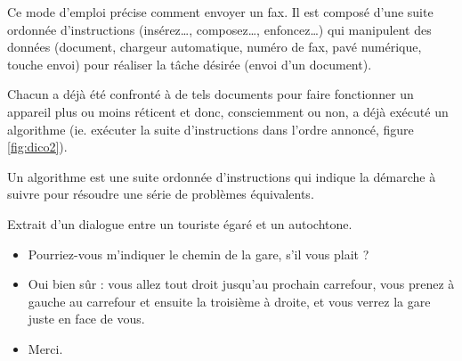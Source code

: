 Ce mode d'emploi précise comment envoyer un fax. Il est composé d'une suite 
ordonnée d'instructions (insérez\ldots, composez\ldots, enfoncez\ldots) qui
manipulent des données (document, chargeur automatique, numéro de fax, pavé numérique,
touche {\sc envoi}) pour réaliser la tâche désirée (envoi d'un document).

Chacun a déjà été confronté à de tels documents pour faire fonctionner un 
appareil plus ou moins réticent et donc, consciemment ou non, 
a déjà exécuté un algorithme (ie. exécuter la suite d'instructions dans l'ordre 
annoncé, figure \ref{fig:dico2}).
\begin{defin}[algorithme]
Un algorithme est une suite ordonnée d'instructions qui indique la démarche 
à suivre pour résoudre une série de problèmes équivalents.
\end{defin}

\begin{ex}\label{ex:cheminGare}
Extrait d'un dialogue entre un touriste égaré et un autochtone.
\begin{itemize}
\item Pourriez-vous m'indiquer le chemin de la gare, s'il vous plait ?
\item Oui bien sûr : vous allez tout droit jusqu'au prochain carrefour,
	vous prenez à gauche au carrefour et ensuite la troisième à droite,
	et vous verrez la gare juste en face de vous.
\item Merci.
\end{itemize}
\end{ex}

